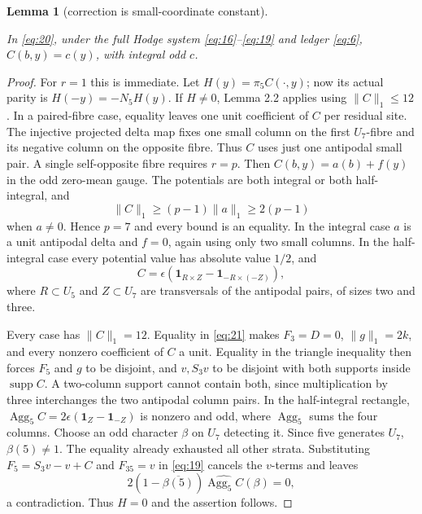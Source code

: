 \documentclass[11pt]{amsart}
\numberwithin{theorem}{section}
\newtheorem{lemma}[theorem]{Lemma}
\theoremstyle{remark}
\numberwithin{equation}{section}
\begin{document}
\begin{lemma}[correction is small-coordinate constant]\label{lemma:8.3}

In \eqref{eq:20}, under the full Hodge system \eqref{eq:16}--\eqref{eq:19} and ledger \eqref{eq:6},
\(C(b,y)=c(y)\), with integral odd \(c\).

\end{lemma}
\begin{proof}

For \(r=1\) this is immediate. Let \(H(y)=\pi_5C(\cdot,y)\); now its
actual parity is \(H(-y)=-N_5H(y)\). If \(H\ne0\), Lemma 2.2 applies
using \(\|C\|_1\le12\). In a paired-fibre case, equality leaves one
unit coefficient of \(C\) per residual site. The injective projected
delta map fixes one small column on the first \(U_7\)-fibre and its
negative column on the opposite fibre. Thus \(C\) uses just one
antipodal small pair. A single self-opposite fibre requires \(r=p\).
Then \(C(b,y)=a(b)+f(y)\) in the odd zero-mean gauge. The potentials
are both integral or both half-integral, and
\[
\|C\|_1\ge(p-1)\|a\|_1\ge2(p-1)
\]
when \(a\ne0\). Hence \(p=7\) and every bound is an equality.
In the integral case \(a\) is a unit antipodal delta and \(f=0\),
again using only two small columns. In the half-integral case every
potential value has absolute value \(1/2\), and
\[
C=\epsilon(\mathbf1_{R\times Z}-\mathbf1_{-R\times(-Z)}),
\]
where \(R\subset U_5\) and \(Z\subset U_7\) are transversals of the
antipodal pairs, of sizes two and three.

Every case has \(\|C\|_1=12\). Equality in \eqref{eq:21} makes \(F_3=D=0\),
\(\|g\|_1=2k\), and every nonzero coefficient of \(C\) a unit.
Equality in the triangle inequality then forces \(F_5\) and \(g\) to
be disjoint, and \(v,S_3v\) to be disjoint with both supports inside
\(\operatorname{supp}C\). A two-column support cannot contain both,
since multiplication by three interchanges the two antipodal column
pairs. In the half-integral rectangle,
\(\operatorname{Agg}_5C=2\epsilon(\mathbf1_Z-\mathbf1_{-Z})\) is
nonzero and odd, where \(\operatorname{Agg}_5\) sums the four columns.
Choose an odd character \(\beta\) on \(U_7\) detecting it. Since five
generates \(U_7\), \(\beta(5)\ne1\). The equality already exhausted
all other strata. Substituting \(F_5=S_3v-v+C\) and \(F_{35}=v\) in
\eqref{eq:19} cancels the \(v\)-terms and leaves
\[
2(1-\overline{\beta(5)})\widehat{\operatorname{Agg}_5C}(\beta)=0,
\]
a contradiction. Thus \(H=0\) and the assertion follows.
\end{proof}
\end{document}
